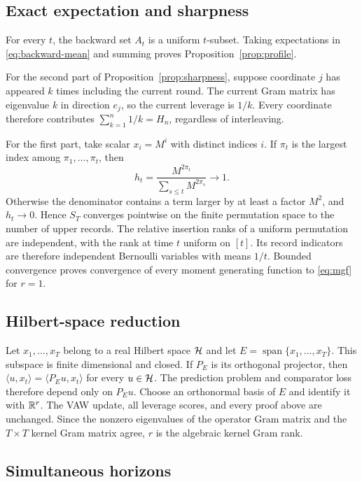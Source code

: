 \subsection{Exact expectation and sharpness}

For every $t$, the backward set $A_t$ is a uniform $t$-subset. Taking expectations in \eqref{eq:backward-mean} and summing proves Proposition~\ref{prop:profile}.

For the second part of Proposition~\ref{prop:sharpness}, suppose coordinate $j$ has appeared $k$ times including the current round. The current Gram matrix has eigenvalue $k$ in direction $e_j$, so the current leverage is $1/k$. Every coordinate therefore contributes $\sum_{k=1}^n1/k=H_n$, regardless of interleaving.

For the first part, take scalar $x_i=M^i$ with distinct indices $i$. If $\pi_t$ is the largest index among $\pi_1,\ldots,\pi_t$, then
\[
 h_t=\frac{M^{2\pi_t}}{\sum_{s\le t}M^{2\pi_s}}\longrightarrow1.
\]
Otherwise the denominator contains a term larger by at least a factor $M^2$, and $h_t\to0$. Hence $S_T$ converges pointwise on the finite permutation space to the number of upper records. The relative insertion ranks of a uniform permutation are independent, with the rank at time $t$ uniform on $[t]$. Its record indicators are therefore independent Bernoulli variables with means $1/t$. Bounded convergence proves convergence of every moment generating function to \eqref{eq:mgf} for $r=1$.

\subsection{Hilbert-space reduction}

Let $x_1,\ldots,x_T$ belong to a real Hilbert space $\mathcal H$ and let
$E=\operatorname{span}\{x_1,\ldots,x_T\}$. This subspace is finite dimensional and closed. If $P_E$ is its orthogonal projector, then
$\langle u,x_t\rangle=\langle P_Eu,x_t\rangle$ for every $u\in\mathcal H$. The prediction problem and comparator loss therefore depend only on $P_Eu$. Choose an orthonormal basis of $E$ and identify it with $\mathbb R^r$. The VAW update, all leverage scores, and every proof above are unchanged. Since the nonzero eigenvalues of the operator Gram matrix and the $T\times T$ kernel Gram matrix agree, $r$ is the algebraic kernel Gram rank.

\subsection{Simultaneous horizons}


